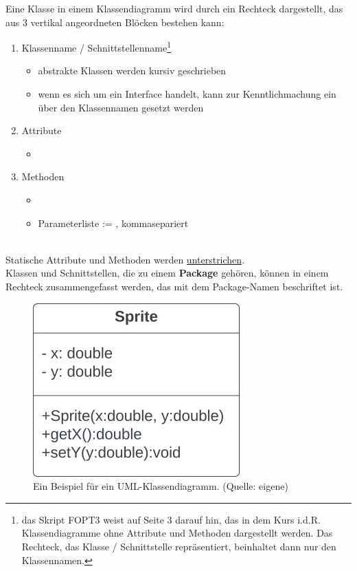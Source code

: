 \noindent
Eine Klasse in einem Klassendiagramm wird durch ein Rechteck dargestellt, das aus 3 vertikal angeordneten Blöcken bestehen kann:\\

\begin{enumerate}
    \item Klassenname / Schnittstellenname\footnote{
        das Skript FOPT3 weist auf Seite 3 darauf hin, das in dem Kurs i.d.R. Klassendiagramme ohne Attribute und Methoden dargestellt werden. Das Rechteck, das Klasse / Schnittstelle repräsentiert, beinhaltet dann nur den Klassennamen.
    }
        \begin{itemize}
            \item abstrakte Klassen werden kursiv geschrieben
            \item wenn es sich um ein Interface handelt, kann zur Kenntlichmachung ein  über den Klassennamen gesetzt werden
        \end{itemize}
    \item Attribute
        \begin{itemize}
            \item[] \code{[Sichtbarkeit] [Name]:[Typ]}
        \end{itemize}
    \item Methoden
    \begin{itemize}
        \item[] \code{[Sichtbarkeit] [Name]([Parameterliste]):[Rückgabetyp]}
        \item[] Parameterliste := , kommasepariert
    \end{itemize}
\end{enumerate}\\

\noindent
Statische Attribute und Methoden werden \ul{unterstrichen}.\\

\noindent
Klassen und Schnittstellen, die zu einem \textbf{Package} gehören, können in einem Rechteck zusammengefasst werden, das mit dem Package-Namen beschriftet ist.

\begin{figure}
    \centering
    \includegraphics[scale=0.5]{chapters/fopt3/img/classdiagram}
    \caption{Ein Beispiel für ein UML-Klassendiagramm. (Quelle: eigene)}
    \label{fig:classdiagram}
\end{figure}


